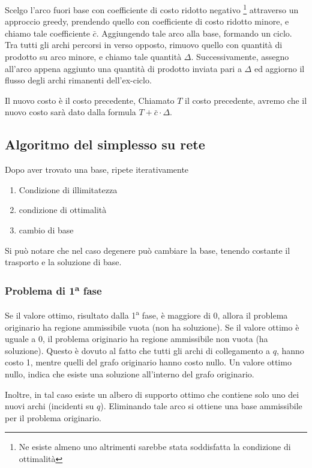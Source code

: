 \documentclass[../template]{subfiles}
\begin{document}
Scelgo l'arco fuori base con coefficiente di costo ridotto negativo \footnote{Ne esiste almeno uno altrimenti
sarebbe stata soddisfatta la condizione di ottimalità} attraverso un approccio greedy, prendendo quello con
coefficiente di costo ridotto minore, e chiamo tale coefficiente $\bar{c}$.
Aggiungendo tale arco alla base, formando un ciclo.
Tra tutti gli archi percorsi in verso opposto, rimuovo quello con quantità di prodotto su arco minore, e chiamo
tale quantità $\Delta$. Successivamente, assegno all'arco appena aggiunto una quantità di prodotto inviata
pari a $\Delta$ ed aggiorno il flusso degli archi rimanenti dell'ex-ciclo.

Il nuovo costo è il costo precedente,
Chiamato $T$ il costo precedente, avremo che il nuovo costo sarà dato dalla formula $T + \bar{c} \cdot \Delta$.

\subsection{Algoritmo del simplesso su rete} %
Dopo aver trovato una base, ripete iterativamente
\begin{enumerate}
    \item Condizione di illimitatezza
    \item condizione di ottimalità
    \item cambio di base
\end{enumerate}
Si può notare che nel caso degenere può cambiare la base, tenendo costante il trasporto e la soluzione di base.
\subsubsection{Problema di 1\textsuperscript{a} fase}
Se il valore ottimo, risultato dalla 1\textsuperscript{a} fase, è maggiore di 0, allora il problema originario ha regione
ammissibile vuota (non ha soluzione).
Se il valore ottimo è uguale a 0, il problema originario ha regione ammissibile non vuota (ha soluzione).
Questo è dovuto al fatto che tutti gli archi di collegamento a $q$, hanno costo 1, mentre quelli del
grafo originario hanno costo nullo. Un valore ottimo nullo, indica che esiste una soluzione all'interno del
grafo originario.

Inoltre, in tal caso esiste un albero di supporto ottimo che contiene solo uno dei nuovi archi (incidenti su $q$).
Eliminando tale arco si ottiene una base ammissibile per il problema originario.

\end{document}
